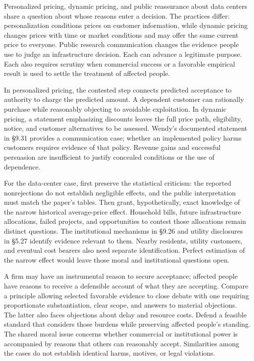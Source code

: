 \noindent \noindent Personalized pricing, dynamic pricing, and public reassurance
about data centers share a question about whose reasons enter a
decision. The practices differ: personalization conditions prices on
customer information, while dynamic pricing changes prices with time or
market conditions and may offer the same current price to everyone.
Public research communication changes the evidence people use to judge
an infrastructure decision. Each can advance a legitimate purpose. Each
also requires scrutiny when commercial success or a favorable empirical
result is used to settle the treatment of affected people.

In personalized pricing, the contested step connects predicted
acceptance to authority to charge the predicted amount. A dependent
customer can rationally purchase while reasonably objecting to avoidable
exploitation. In dynamic pricing, a statement emphasizing discounts
leaves the full price path, eligibility, notice, and customer
alternatives to be assessed. Wendy's documented statement in §9.31
provides a communication case; whether an implemented policy harms
customers requires evidence of that policy. Revenue gains and successful
persuasion are insufficient to justify concealed conditions or the use
of dependence.

For the data-center case, first preserve the statistical criticism: the
reported nonrejections do not establish negligible effects, and the
public interpretation must match the paper's tables. Then grant,
hypothetically, exact knowledge of the narrow historical average-price
effect. Household bills, future infrastructure allocations, failed
projects, and opportunities to contest those allocations remain distinct
questions. The institutional mechanisms in §9.26 and utility disclosures
in §5.27 identify evidence relevant to them. Nearby residents, utility
customers, and eventual cost bearers also need separate identification.
Perfect estimation of the narrow effect would leave those moral and
institutional questions open.

A firm may have an instrumental reason to secure acceptance; affected
people have reasons to receive a defensible account of what they are
accepting. Compare a principle allowing selected favorable evidence to
close debate with one requiring proportionate substantiation, clear
scope, and answers to material objections. The latter also faces
objections about delay and resource costs. Defend a feasible standard
that considers those burdens while preserving affected people's
standing. The shared moral issue concerns whether commercial or
institutional power is accompanied by reasons that others can reasonably
accept. Similarities among the cases do not establish identical harms,
motives, or legal violations.

